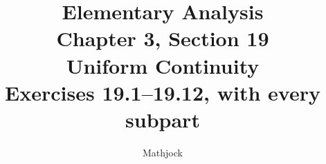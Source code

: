 
\title{\textbf{Elementary Analysis}\\[0.3em]
Chapter 3, Section 19\\[0.3em]
\large Uniform Continuity\\
Exercises 19.1--19.12, with every subpart}
\author{Mathjock}
\date{}

\maketitle
\bookinfo
\tableofcontents
\clearpage
\setcounter{section}{18}


